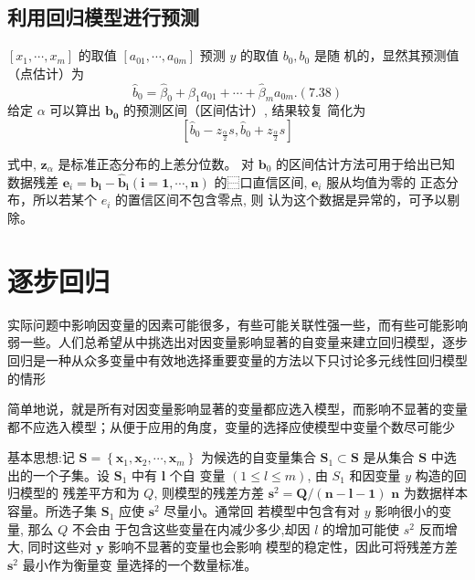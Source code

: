 \subsection{利用回归模型进行预测}

\( \left[x_{1}, \cdots, x_{m}\right] \) 的取值 \( \left[a_{01}, \cdots, a_{0 m}\right] \) 预测 \( y \) 的取值 \( b_{0}, b_{0} \) 是随 机的，显然其预测值（点估计）为
$$
\hat{b}_{0}=\hat{\beta}_{0}+\hat{\beta}_{1} a_{01}+\cdots+\hat{\beta}_{m} a_{0 m} .(7.38)
$$
给定 \( \alpha \) 可以算出 \( \boldsymbol{b}_{\mathbf{0}} \) 的预测区间（区间估计）, 结果较复
简化为
$$
\left[\hat{b}_{0}-z_{\frac{\alpha}{2}} s, \hat{b}_{0}+z_{\frac{\alpha}{2}} s\right]
$$

式中, \( \boldsymbol{z}_{\alpha} \) 是标准正态分布的上恙分位数。
对 \( \boldsymbol{b}_{0} \) 的区间估计方法可用于给出已知数据残差 \( \boldsymbol{e}_{i}=\boldsymbol{b}_{\boldsymbol{i}}-\hat{\boldsymbol{b}}_{\boldsymbol{i}}(\boldsymbol{i}=\mathbf{1}, \cdots, \boldsymbol{n}) \) 的⿱口直信区间, \( \boldsymbol{e}_{i} \) 服从均值为零的
正态分布，所以若某个 \( e_{i} \) 的置信区间不包含零点, 则 认为这个数据是异常的，可予以剔除。

\section{逐步回归}

实际问题中影响因变量的因素可能很多，有些可能关联性强一些，而有些可能影响弱一些。人们总希望从中挑选出对因变量影响显著的自变量来建立回归模型，逐步回归是一种从众多变量中有效地选择重要变量的方法以下只讨论多元线性回归模型的情形

简单地说，就是所有对因变量影响显著的变量都应选入模型，而影响不显著的变量都不应选入模型；从便于应用的角度，变量的选择应使模型中变量个数尽可能少

基本思想:记 \( \boldsymbol{S}=\left\{\boldsymbol{x}_{1}, \boldsymbol{x}_{2}, \cdots, \boldsymbol{x}_{m}\right\} \) 为候选的自变量集合
\( \boldsymbol{S}_{1} \subset \boldsymbol{S} \) 是从集合 \( \boldsymbol{S} \) 中选出的一个子集。设 \( \boldsymbol{S}_{1} \) 中有 \( \boldsymbol{l} \) 个自
变量 \( (1 \leq l \leq m) \), 由 \( S_{1} \) 和因变量 \( y \) 构造的回归模型的 残差平方和为 \( Q \), 则模型的残差方差 \( \boldsymbol{s}^{2}=\boldsymbol{Q} /(\boldsymbol{n}-\boldsymbol{l}-\mathbf{1}) \)
\( \boldsymbol{n} \) 为数据样本容量。所选子集 \( \boldsymbol{S}_{1} \) 应使 \( \boldsymbol{s}^{2} \) 尽量小。通常回
若模型中包含有对 \( y \) 影响很小的变量, 那么 \( Q \) 不会由 于包含这些变量在内减少多少,却因 \( l \) 的增加可能使 \( s^{2} \) 反而增大, 同时这些对 \( \boldsymbol{y} \) 影响不显著的变量也会影响 模型的稳定性，因此可将残差方差 \( \boldsymbol{s}^{2} \) 最小作为衡量变
量选择的一个数量标准。

